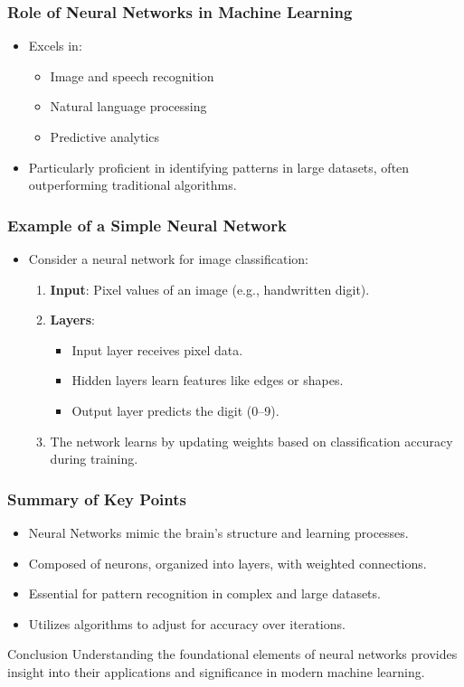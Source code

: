 \documentclass[aspectratio=169]{beamer}
\begin{document}
\begin{frame}[fragile]
    \frametitle{Role of Neural Networks in Machine Learning}
    \begin{itemize}
        \item Excels in:
        \begin{itemize}
            \item Image and speech recognition
            \item Natural language processing
            \item Predictive analytics
        \end{itemize}
        \item Particularly proficient in identifying patterns in large datasets, often outperforming traditional algorithms.
    \end{itemize}
\end{frame}

\begin{frame}[fragile]
    \frametitle{Example of a Simple Neural Network}
    \begin{itemize}
        \item Consider a neural network for image classification:
        \begin{enumerate}
            \item \textbf{Input}: Pixel values of an image (e.g., handwritten digit).
            \item \textbf{Layers}: 
            \begin{itemize}
                \item Input layer receives pixel data.
                \item Hidden layers learn features like edges or shapes.
                \item Output layer predicts the digit (0–9).
            \end{itemize}
            \item The network learns by updating weights based on classification accuracy during training.
        \end{enumerate}
    \end{itemize}
\end{frame}

\begin{frame}[fragile]
    \frametitle{Summary of Key Points}
    \begin{itemize}
        \item Neural Networks mimic the brain's structure and learning processes.
        \item Composed of neurons, organized into layers, with weighted connections.
        \item Essential for pattern recognition in complex and large datasets.
        \item Utilizes algorithms to adjust for accuracy over iterations.
    \end{itemize}
    \begin{block}{Conclusion}
        Understanding the foundational elements of neural networks provides insight into their applications and significance in modern machine learning.
    \end{block}
\end{frame}
\end{document}
